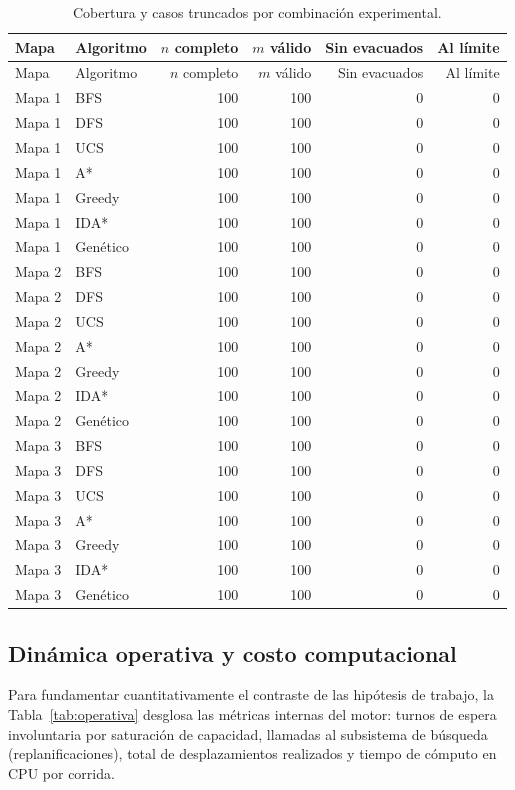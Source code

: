 \documentclass[11pt,letterpaper]{article}
\begin{document}
\small
\begin{longtable}{@{}llrrrr@{}}
\caption{Cobertura y casos truncados por combinación experimental.}\label{tab:cobertura}\\
\toprule
Mapa & Algoritmo & $n$ completo & $m$ válido & Sin evacuados & Al límite \\
\midrule
\endfirsthead
\toprule
Mapa & Algoritmo & $n$ completo & $m$ válido & Sin evacuados & Al límite \\
\midrule
\endhead
\bottomrule
\endfoot
Mapa 1 & BFS      & 100 & 100 & 0 & 0 \\
Mapa 1 & DFS      & 100 & 100 & 0 & 0 \\
Mapa 1 & UCS      & 100 & 100 & 0 & 0 \\
Mapa 1 & A*       & 100 & 100 & 0 & 0 \\
Mapa 1 & Greedy   & 100 & 100 & 0 & 0 \\
Mapa 1 & IDA*     & 100 & 100 & 0 & 0 \\
Mapa 1 & Genético & 100 & 100 & 0 & 0 \\
\midrule
Mapa 2 & BFS      & 100 & 100 & 0 & 0 \\
Mapa 2 & DFS      & 100 & 100 & 0 & 0 \\
Mapa 2 & UCS      & 100 & 100 & 0 & 0 \\
Mapa 2 & A*       & 100 & 100 & 0 & 0 \\
Mapa 2 & Greedy   & 100 & 100 & 0 & 0 \\
Mapa 2 & IDA*     & 100 & 100 & 0 & 0 \\
Mapa 2 & Genético & 100 & 100 & 0 & 0 \\
\midrule
Mapa 3 & BFS      & 100 & 100 & 0 & 0 \\
Mapa 3 & DFS      & 100 & 100 & 0 & 0 \\
Mapa 3 & UCS      & 100 & 100 & 0 & 0 \\
Mapa 3 & A*       & 100 & 100 & 0 & 0 \\
Mapa 3 & Greedy   & 100 & 100 & 0 & 0 \\
Mapa 3 & IDA*     & 100 & 100 & 0 & 0 \\
Mapa 3 & Genético & 100 & 100 & 0 & 0 \\
\end{longtable}
\normalsize

\subsection{Dinámica operativa y costo computacional}
Para fundamentar cuantitativamente el contraste de las hipótesis de trabajo, la Tabla~\ref{tab:operativa} desglosa las métricas internas del motor: turnos de espera involuntaria por saturación de capacidad, llamadas al subsistema de búsqueda (replanificaciones), total de desplazamientos realizados y tiempo de cómputo en CPU por corrida.
\end{document}
